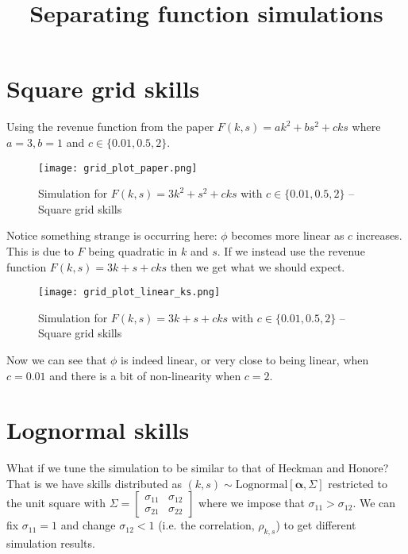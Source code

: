 \documentclass{article}
\title{Separating function simulations}
\author{}
\date{}
\begin{document}
	
	\section{Square grid skills}
	
	Using the revenue function from the paper $F(k,s) = ak^2 + bs^2 + cks$ where $a=3,b=1$ and $c \in \{0.01,0.5,2\}$.
	
	\begin{figure}[H]
		\centering
		\texttt{[image: grid\_plot\_paper.png]}
		\caption{Simulation for $F(k,s) = 3k^2 + s^2 + cks$ with $c\in\{0.01,0.5,2\}$ -- Square grid skills}
	\end{figure}
	
	Notice something strange is occurring here: $\phi$ becomes more linear as $c$ increases.\\
	
	This is due to $F$ being quadratic in $k$ and $s$. If we instead use the revenue function $F(k,s) = 3k + s + cks$ then we get what we should expect.
	
	\begin{figure}[H]
		\centering
		\texttt{[image: grid\_plot\_linear\_ks.png]}
		\caption{Simulation for $F(k,s) = 3k + s + cks$ with $c\in\{0.01,0.5,2\}$ -- Square grid skills}
	\end{figure}
	
	Now we can see that $\phi$ is indeed linear, or very close to being linear, when $c=0.01$ and there is a bit of non-linearity when $c=2$.\\
	
	\section{Lognormal skills}
	What if we tune the simulation to be similar to that of Heckman and Honore? That is we have skills distributed as $(k,s) \sim \text{Lognormal}[\mathbf{\alpha},\Sigma]$ restricted to the unit square with $\Sigma = \begin{bmatrix}
		\sigma_{11} & \sigma_{12} \\
		\sigma_{21} & \sigma_{22}
	\end{bmatrix}$ where we impose that $\sigma_{11} > \sigma_{12}$. We can fix $\sigma_{11}=1$ and change $\sigma_{12}<1$ (i.e. the correlation, $\rho_{k,s}$) to get different simulation results.
	
\end{document}
